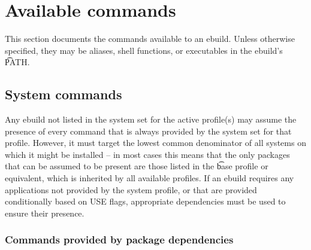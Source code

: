 \section{Available commands}
\label{ebuild-env-commands}

This section documents the commands available to an ebuild. Unless otherwise specified, they may be
aliases, shell functions, or executables in the ebuild's \t{PATH}.

\subsection{System commands}

Any ebuild not listed in the system set for the active profile(s) may assume the presence of every
command that is always provided by the system set for that profile. However, it must target the
lowest common denominator of all systems on which it might be installed -- in most cases this means
that the only packages that can be assumed to be present are those listed in the \t{base} profile or
equivalent, which is inherited by all available profiles. If an ebuild requires any applications not
provided by the system profile, or that are provided conditionally based on USE flags, appropriate
dependencies must be used to ensure their presence.

\subsubsection{Commands provided by package dependencies}





